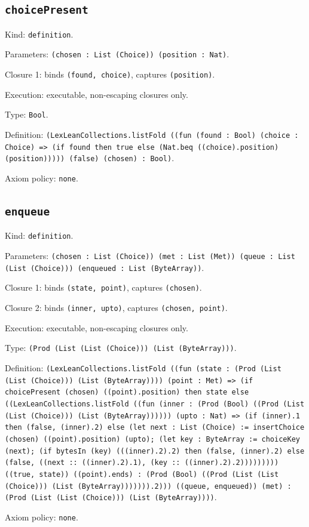 \documentclass[11pt]{article}
\begin{document}
\subsection*{\texttt{choicePresent}}
\noindent Kind: \texttt{definition}.\par
\noindent Parameters: \texttt{(chosen : List (Choice)) (position : Nat)}.\par
\noindent Closure 1: binds \texttt{(found, choice)}, captures \texttt{(position)}.\par
\noindent Execution: executable, non-escaping closures only.\par
\noindent Type: \texttt{Bool}.\par
\noindent Definition: \texttt{(LexLeanCollections.listFold ((fun (found : Bool) (choice : Choice) => (if found then true else (Nat.beq ((choice).position) (position))))) (false) (chosen) : Bool)}.\par
\noindent Axiom policy: \texttt{none}.\par
\subsection*{\texttt{enqueue}}
\noindent Kind: \texttt{definition}.\par
\noindent Parameters: \texttt{(chosen : List (Choice)) (met : List (Met)) (queue : List (List (Choice))) (enqueued : List (ByteArray))}.\par
\noindent Closure 1: binds \texttt{(state, point)}, captures \texttt{(chosen)}.\par
\noindent Closure 2: binds \texttt{(inner, upto)}, captures \texttt{(chosen, point)}.\par
\noindent Execution: executable, non-escaping closures only.\par
\noindent Type: \texttt{(Prod (List (List (Choice))) (List (ByteArray)))}.\par
\noindent Definition: \texttt{(LexLeanCollections.listFold ((fun (state : (Prod (List (List (Choice))) (List (ByteArray)))) (point : Met) => (if choicePresent (chosen) ((point).position) then state else ((LexLeanCollections.listFold ((fun (inner : (Prod (Bool) ((Prod (List (List (Choice))) (List (ByteArray)))))) (upto : Nat) => (if (inner).1 then (false, (inner).2) else (let next : List (Choice) := insertChoice (chosen) ((point).position) (upto); (let key : ByteArray := choiceKey (next); (if bytesIn (key) (((inner).2).2) then (false, (inner).2) else (false, ((next :: ((inner).2).1), (key :: ((inner).2).2))))))))) ((true, state)) ((point).ends) : (Prod (Bool) ((Prod (List (List (Choice))) (List (ByteArray))))))).2))) ((queue, enqueued)) (met) : (Prod (List (List (Choice))) (List (ByteArray))))}.\par
\noindent Axiom policy: \texttt{none}.\par
\end{document}
